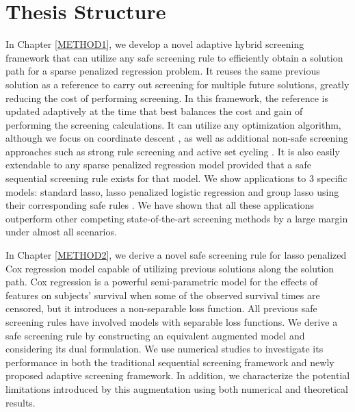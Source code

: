 \section{Thesis Structure}

In Chapter \ref{METHOD1}, we develop a novel adaptive hybrid screening framework that can utilize any safe screening rule to efficiently obtain a solution path for a sparse penalized regression problem. It reuses the same previous solution as a reference to carry out screening for multiple future solutions, greatly reducing the cost of performing screening. In this framework, the reference is updated adaptively at the time that best balances the cost and gain of performing the screening calculations. It can utilize any optimization algorithm, although we focus on coordinate descent \citep{friedman2007pathwise}, as well as additional non-safe screening approaches such as strong rule screening \citep{Tibshirani2012} and active set cycling \citep{lee2007efficient}. It is also easily extendable to any sparse penalized regression model provided that a safe sequential screening rule exists for that model. We show applications to 3 specific models: standard lasso, lasso penalized logistic regression and group lasso using their corresponding safe rules \citep{wang2013lasso,wang2014safe}. We have shown that all these applications outperform other competing state-of-the-art screening methods by a large margin under almost all scenarios.

In Chapter \ref{METHOD2}, we derive a novel safe screening rule for lasso penalized Cox regression model \citep{cox1972regression} capable of utilizing previous solutions along the solution path. Cox regression is a powerful semi-parametric model for the effects of features on subjects' survival when some of the observed survival times are censored, but it introduces a non-separable loss function. All previous safe screening rules have involved models with separable loss functions. We derive a safe screening rule by constructing an equivalent augmented model and considering its dual formulation. We use numerical studies to investigate its performance in both the traditional sequential screening framework and newly proposed adaptive screening framework. In addition, we characterize the potential limitations introduced by this augmentation using both numerical and theoretical results.

